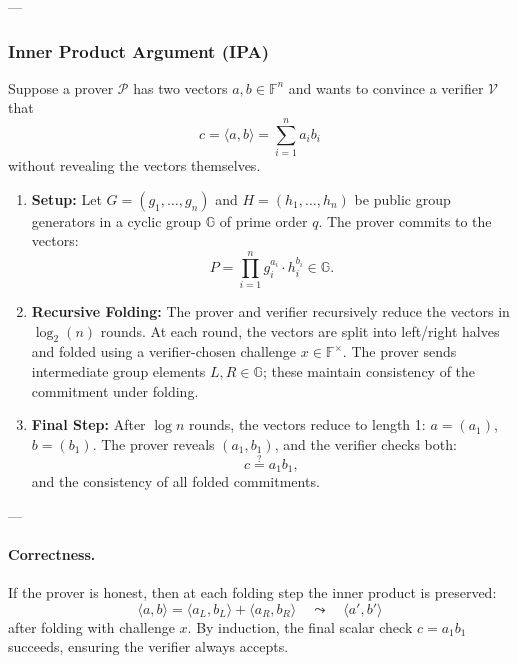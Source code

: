 ---

\subsubsection*{Inner Product Argument (IPA)}

Suppose a prover $\mathcal{P}$ has two vectors $a, b \in \mathbb{F}^n$ and wants to convince a verifier $\mathcal{V}$ that
\[
c = \langle a, b \rangle = \sum_{i=1}^n a_i b_i
\]
without revealing the vectors themselves.  

\begin{protocol}
\begin{enumerate}
  \item \textbf{Setup:}  
  Let $G = (g_1, \dots, g_n)$ and $H = (h_1, \dots, h_n)$ be public group generators in a cyclic group $\mathbb{G}$ of prime order $q$.  
  The prover commits to the vectors:
  \[
    P = \prod_{i=1}^n g_i^{a_i} \cdot h_i^{b_i} \in \mathbb{G}.
  \]

  \item \textbf{Recursive Folding:}  
  The prover and verifier recursively reduce the vectors in $\log_2(n)$ rounds.  
  At each round, the vectors are split into left/right halves and folded using a verifier-chosen challenge $x \in \mathbb{F}^\times$.  
  The prover sends intermediate group elements $L, R \in \mathbb{G}$; these maintain consistency of the commitment under folding.

  \item \textbf{Final Step:}  
  After $\log n$ rounds, the vectors reduce to length 1: $a = (a_1)$, $b = (b_1)$.  
  The prover reveals $(a_1, b_1)$, and the verifier checks both:
  \[
    c \stackrel{?}{=} a_1 b_1,
  \]
  and the consistency of all folded commitments.
\end{enumerate}
\end{protocol}

---

\paragraph{Correctness.}

If the prover is honest, then at each folding step the inner product is preserved:  
\[
\langle a, b \rangle = \langle a_L, b_L \rangle + \langle a_R, b_R \rangle \quad \leadsto \quad \langle a', b' \rangle
\]
after folding with challenge $x$.  
By induction, the final scalar check $c = a_1 b_1$ succeeds, ensuring the verifier always accepts.

